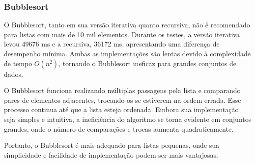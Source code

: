 \subsubsection{Bubblesort}

\hspace{0.6cm}O Bubblesort, tanto em sua versão iterativa quanto recursiva, não é recomendado para listas com mais de 10 mil elementos. Durante os testes, a versão iterativa levou 49676 ms e a recursiva, 36172 ms, apresentando uma diferença de desempenho mínima. Ambas as implementações são lentas devido à complexidade de tempo \(O(n^2)\), tornando o Bubblesort ineficaz para grandes conjuntos de dados.

O Bubblesort funciona realizando múltiplas passagens pela lista e comparando pares de elementos adjacentes, trocando-os se estiverem na ordem errada. Esse processo continua até que a lista esteja ordenada. Embora sua implementação seja simples e intuitiva, a ineficiência do algoritmo se torna evidente em conjuntos grandes, onde o número de comparações e trocas aumenta quadraticamente.

Portanto, o Bubblesort é mais adequado para listas pequenas, onde sua simplicidade e facilidade de implementação podem ser mais vantajosas.
